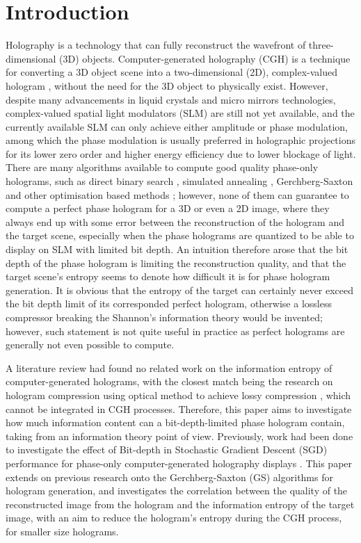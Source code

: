\section{Introduction}
	Holography is a technology that can fully reconstruct the wavefront of three-dimensional (3D) objects. Computer-generated holography (CGH) is a technique for converting a 3D object scene into a two-dimensional (2D), complex-valued hologram \cite{Tsang2018}, without the need for the 3D object to physically exist. However, despite many advancements in liquid crystals and micro mirrors technologies, complex-valued spatial light modulators (SLM) are still not yet available, and the currently available SLM can only achieve either amplitude or phase modulation, among which the phase modulation is usually preferred in holographic projections for its lower zero order and higher energy efficiency due to lower blockage of light. There are many algorithms available to compute good quality phase-only holograms, such as direct binary search \cite{Seldowitz1987}, simulated annealing \cite{Kirkpatrick1983}, Gerchberg-Saxton \cite{Gerchberg1972} and other optimisation based methods \cite{Zhang2017, Liu2020, Choi2021, Chen2021, Kadis2022, Sha2023}; however, none of them can guarantee to compute a perfect phase hologram for a 3D or even a 2D image, where they always end up with some error between the reconstruction of the hologram and the target scene, especially when the phase holograms are quantized to be able to display on SLM with limited bit depth. An intuition therefore arose that the bit depth of the phase hologram is limiting the reconstruction quality, and that the target scene's entropy seems to denote how difficult it is for phase hologram generation. It is obvious that the entropy of the target can certainly never exceed the bit depth limit of its corresponded perfect hologram, otherwise a lossless compressor breaking the Shannon's information theory \cite{Shannon1948} would be invented; however, such statement is not quite useful in practice as perfect holograms are generally not even possible to compute.

	A literature review had found no related work on the information entropy of computer-generated holograms, with the closest match being the research on hologram compression using optical method to achieve lossy compression \cite{Kollin1988}, which cannot be integrated in CGH processes. Therefore, this paper aims to investigate how much information content can a bit-depth-limited phase hologram contain, taking from an information theory point of view. Previously, work had been done to investigate the effect of Bit-depth in Stochastic Gradient Descent (SGD) performance for phase-only computer-generated holography displays \cite{Kadis2022}. This paper extends on previous research onto the Gerchberg-Saxton (GS) \cite{Gerchberg1972} algorithms for hologram generation, and investigates the correlation between the quality of the reconstructed image from the hologram and the information entropy of the target image, with an aim to reduce the hologram's entropy during the CGH process, for smaller size holograms.



